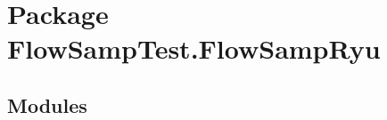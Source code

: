 %
%
%


\section{Package FlowSampTest.FlowSampRyu}

    \label{FlowSampTest:FlowSampRyu}


\subsection{Modules}

